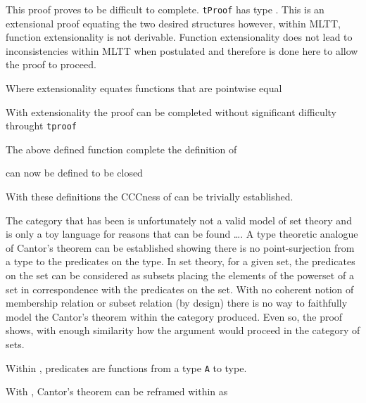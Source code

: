 This proof proves to be difficult to complete. \verb|tProof| has type
. This is an extensional proof equating the two desired structures
however, within MLTT, function extensionality is not derivable. Function extensionality
does not lead to inconsistencies within MLTT when postulated and therefore is
done here to allow the proof to proceed.


Where extensionality equates functions that are pointwise equal


With extensionality the proof can be completed without significant difficulty
throught \verb|tproof|


The above defined function complete the definition of 


 can now be defined to be closed

With these definitions the CCCness of  can be trivially
established.

The category that has been is unfortunately not a valid model of set theory and
is only a toy language for reasons that can be found \ldots {}.
A type theoretic analogue of Cantor's theorem can be established showing there
is no point-surjection from a type to the predicates on the type. In set theory,
for a given set, the predicates on the set can be considered as subsets placing
the elements of the powerset of a set in correspondence with the predicates on
the set. With no coherent notion of membership relation or subset relation (by
design) there is no way to faithfully model the Cantor's theorem  within the
category produced. Even so, the proof shows, with enough similarity how the
argument would proceed in the category of sets.

Within , predicates are functions from a type \verb|A| to
 type.


With , Cantor's theorem can be reframed within
 as

